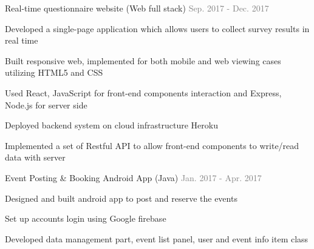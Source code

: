 

\begin{cventries}


  \cventry
    {}
    {Real-time questionnaire website (Web full stack)} %
    {
      \textcolor{graytext}{Sep. 2017 - Dec. 2017}
    } %
    {}
    {}

  \vspace{-15mm}
  \cventry
    {}
    {}
    {}
    {}
    {
      \begin{cvitems} %
        \item {Developed a single-page application which allows users to collect survey results in real time}
        \item {Built responsive web, implemented for both mobile and web viewing cases utilizing HTML5 and CSS}
        \item {Used React, JavaScript for front-end components interaction and Express, Node.js for server side}
        \item {Deployed backend system on cloud infrastructure Heroku}
        \item {Implemented a set of Restful API to allow front-end components to write/read data with server}
      \end{cvitems}
    }


  \cventry
    {}
    {Event Posting \& Booking Android App (Java)} %
    {
      \textcolor{graytext}{Jan. 2017 - Apr. 2017} %
    }
    {}
    {}

  \vspace{-15mm}
  \cventry
    {}
    {}
    {}
    {}
    {
      \begin{cvitems} %
        \item {Designed and built android app to post and reserve the events}
        \item {Set up accounts login using Google firebase}
        \item {Developed data management part, event list panel, user and event info item class}
      \end{cvitems}
    }


\end{cventries}
